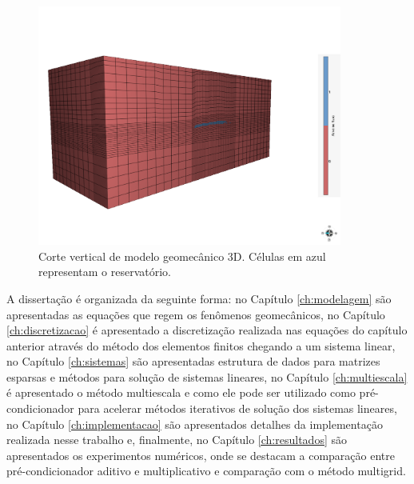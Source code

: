 
\begin{figure}[!htbp]
\centering
\includegraphics[width=10cm]{chap00/figs/Geresim(0054).png}
\caption{Corte vertical de modelo geomecânico 3D. Células em azul representam o reservatório.}
\label{fig:modelogeomec3d}
\end{figure}

A dissertação é organizada da seguinte forma: no Capítulo \ref{ch:modelagem} são apresentadas as equações que regem os fenômenos geomecânicos, no Capítulo \ref{ch:discretizacao} é apresentado a discretização realizada nas equações do capítulo anterior através do método dos elementos finitos chegando a um sistema linear, no Capítulo \ref{ch:sistemas} são apresentadas estrutura de dados para matrizes esparsas e métodos para solução de sistemas lineares, no Capítulo \ref{ch:multiescala} é apresentado o método multiescala e como ele pode ser utilizado como pré-condicionador para acelerar métodos iterativos de solução dos sistemas lineares, no Capítulo \ref{ch:implementacao} são apresentados detalhes da implementação realizada nesse trabalho e, finalmente, no Capítulo \ref{ch:resultados} são apresentados os experimentos numéricos, onde se destacam a comparação entre pré-condicionador aditivo e multiplicativo e comparação com o método multigrid. 